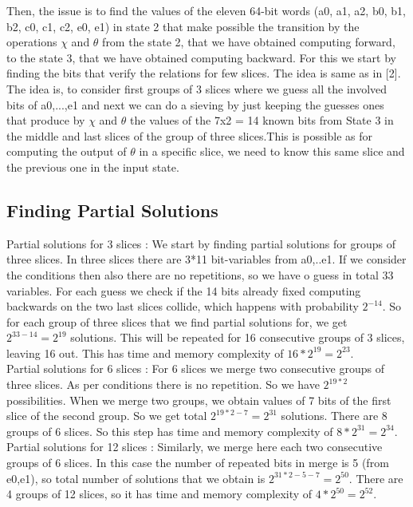 \documentclass{article}
\begin{document}
\newpar
Then, the issue is to find the values of the eleven 64-bit words (a0, a1, a2, b0, b1, b2, c0, c1, c2, e0, e1) in state 2 that make possible the transition by the operations $\chi$ and $\theta$ from the state 2, that we have obtained computing forward, to the state 3, that we have obtained computing backward. For this we start by finding the bits that verify the relations for few slices.  The idea is same as in [2]. The idea is, to consider first groups of 3 slices where we guess all the involved bits of a0,...,e1 and next we can do a sieving by just keeping the guesses ones that produce by $\chi$ and $\theta$ the values of the 7x2 = 14 known bits from State 3 in the middle and last slices of the group of three slices.This is possible as for computing the output of $\theta$ in a specific slice, we need to know this same slice and the previous one in the input state.

\subsection{Finding Partial Solutions}

\newpar
Partial solutions for 3 slices : We start by finding partial solutions for groups of three slices. In three slices there are 3*11 bit-variables from a0,..e1. If we consider the conditions then also there are no repetitions, so we have o guess in total 33 variables. For each guess we check if the 14 bits already fixed computing backwards on the two last slices collide, which happens with probability $2^{-14}$. So for each group of three slices that we find partial solutions for, we get $2^{33 - 14} = 2^{19}$ solutions. This will be repeated for 16 consecutive groups of 3 slices, leaving 16 out. This has time and memory complexity of $16 * 2^{19} = 2^{23}$.\\

\newpar
Partial solutions for 6 slices : For 6 slices we merge two consecutive groups of three slices. As per conditions there is no repetition. So we have $2^{19*2}$ possibilities. When we merge two groups, we obtain values of 7 bits of the first slice of the second group. So we get total $2^{19*2 - 7 } = 2^{31}$ solutions. There are 8 groups of 6 slices. So this step has time and memory complexity of $8*2^{31} = 2^{34}$.\\

\newpar
Partial solutions for 12 slices : Similarly, we merge here each two consecutive groups of 6 slices. In this case the number of repeated bits in merge is 5 (from e0,e1), so total number of solutions that we obtain is $2^{31*2 - 5 - 7 } = 2^{50}$. There are 4 groups of 12 slices, so it has time and memory complexity of $4*2^{50} = 2^{52}$.\\
\end{document}
